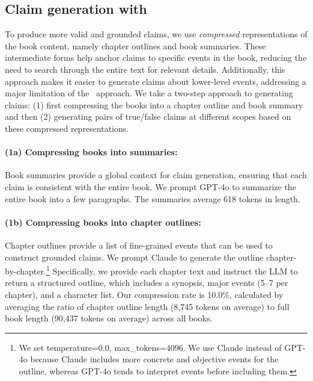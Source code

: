\subsection{Claim generation with \pipeline} 
\label{data:claims_generation}
To produce more valid and grounded claims, we use \textit{compressed} representations of the book content, namely chapter outlines and book summaries. These intermediate forms help anchor claims to specific events in the book, reducing the need to search through the entire text for relevant details. Additionally, this approach makes it easier to generate claims about lower-level events, addressing a major limitation of the \naive\ approach. We take a two-step approach to generating claims: (1) first compressing the books into a chapter outline and book summary and then (2) generating pairs of true/false claims at different scopes based on these compressed representations.

\paragraph{(1a) Compressing books into summaries:} Book summaries provide a global context for claim generation, ensuring that each claim is consistent with the entire book. We prompt GPT-4o to summarize the entire book into a few paragraphs. The summaries average 618 tokens in length.

\paragraph{(1b) Compressing books into chapter outlines:} Chapter outlines provide a list of fine-grained events that can be used to construct grounded claims. We prompt Claude to generate the outline chapter-by-chapter.\footnote{We set temperature=0.0, max\_tokens=4096. We use Claude instead of GPT-4o because Claude includes more concrete and objective events for the outline, whereas GPT-4o tends to interpret events before including them.} Specifically, we provide each chapter text and instruct the LLM to return a structured outline, which includes a synopsis, major events (5–7 per chapter), and a character list. Our compression rate is 10.0\%, calculated by averaging the ratio of chapter outline length (8,745 tokens on average) to full book length (90,437 tokens on average) across all books.

